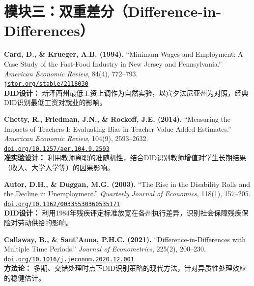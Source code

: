 \documentclass[12pt, a4paper]{article}
\begin{document}
\section*{模块三：双重差分（Difference-in-Differences）}

\begin{enumerate}[label=\textbf{[\arabic*]}, leftmargin=*, itemsep=1em, start=10]

\item \textbf{Card, D., \& Krueger, A.B. (1994).}
  ``Minimum Wages and Employment: A Case Study of the Fast-Food Industry in New Jersey and Pennsylvania.''
  \emph{American Economic Review}, 84(4), 772--793.\\
  \href{https://www.jstor.org/stable/2118030}{\texttt{jstor.org/stable/2118030}}\\
  {\small \textcolor{asher}{\textbf{DID设计：} 新泽西州最低工资上调作为自然实验，以宾夕法尼亚州为对照，经典DID识别最低工资对就业的影响。}}

\item \textbf{Chetty, R., Friedman, J.N., \& Rockoff, J.E. (2014).}
  ``Measuring the Impacts of Teachers I: Evaluating Bias in Teacher Value-Added Estimates.''
  \emph{American Economic Review}, 104(9), 2593--2632.\\
  \href{https://doi.org/10.1257/aer.104.9.2593}{\texttt{doi.org/10.1257/aer.104.9.2593}}\\
  {\small \textcolor{asher}{\textbf{准实验设计：} 利用教师离职的准随机性，结合DID识别教师增值对学生长期结果（收入、大学入学等）的因果影响。}}

\item \textbf{Autor, D.H., \& Duggan, M.G. (2003).}
  ``The Rise in the Disability Rolls and the Decline in Unemployment.''
  \emph{Quarterly Journal of Economics}, 118(1), 157--205.\\
  \href{https://doi.org/10.1162/00335530360535171}{\texttt{doi.org/10.1162/00335530360535171}}\\
  {\small \textcolor{asher}{\textbf{DID设计：} 利用1984年残疾评定标准放宽在各州执行差异，识别社会保障残疾保险对劳动供给的影响。}}

\item \textbf{Callaway, B., \& Sant'Anna, P.H.C. (2021).}
  ``Difference-in-Differences with Multiple Time Periods.''
  \emph{Journal of Econometrics}, 225(2), 200--230.\\
  \href{https://doi.org/10.1016/j.jeconom.2020.12.001}{\texttt{doi.org/10.1016/j.jeconom.2020.12.001}}\\
  {\small \textcolor{asher}{\textbf{方法论：} 多期、交错处理时点下DID识别策略的现代方法，针对异质性处理效应的稳健估计。}}

\end{enumerate}
\end{document}
